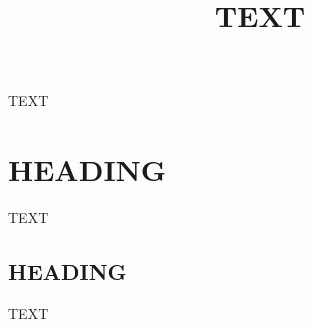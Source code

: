 \documentclass[journal abbreviation, manuscript]{copernicus}
\begin{document}
\title{TEXT}



\Author[][EMAIL]{}{} %
\Author[]{}{}
\Author[]{}{}















\received{}
\pubdiscuss{} %
\revised{}
\accepted{}
\published{}




\maketitle








\introduction  %
TEXT


\section{HEADING}
TEXT


\subsection{HEADING}
TEXT
\end{document}
